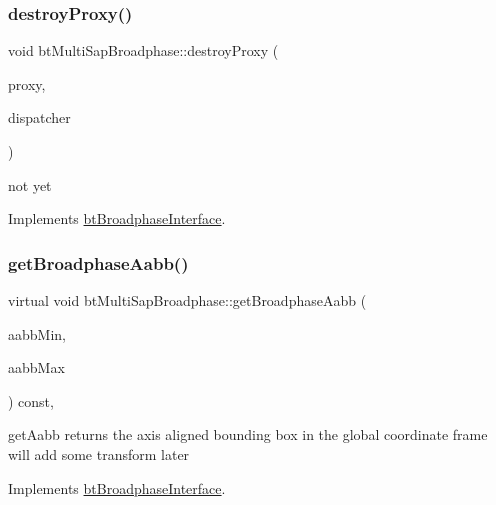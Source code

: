 \subsubsection{\texorpdfstring{destroy\+Proxy()}{destroyProxy()}}
{\footnotesize\ttfamily void bt\+Multi\+Sap\+Broadphase\+::destroy\+Proxy (\begin{DoxyParamCaption}\item[{bt\+Broadphase\+Proxy $\ast$}]{proxy,  }\item[{\hyperlink{classbtDispatcher}{bt\+Dispatcher} $\ast$}]{dispatcher }\end{DoxyParamCaption})\hspace{0.3cm}{\ttfamily [virtual]}}

not yet 

Implements \hyperlink{classbtBroadphaseInterface}{bt\+Broadphase\+Interface}.

\mbox{\label{classbtMultiSapBroadphase_a37a11b7ee2889d80adaf5add6fffe782}} 
\subsubsection{\texorpdfstring{get\+Broadphase\+Aabb()}{getBroadphaseAabb()}\hspace{0.1cm}{\footnotesize\ttfamily [1/2]}}
{\footnotesize\ttfamily virtual void bt\+Multi\+Sap\+Broadphase\+::get\+Broadphase\+Aabb (\begin{DoxyParamCaption}\item[{bt\+Vector3 \&}]{aabb\+Min,  }\item[{bt\+Vector3 \&}]{aabb\+Max }\end{DoxyParamCaption}) const\hspace{0.3cm}{\ttfamily [inline]}, {\ttfamily [virtual]}}

get\+Aabb returns the axis aligned bounding box in the \textquotesingle{}global\textquotesingle{} coordinate frame will add some transform later 

Implements \hyperlink{classbtBroadphaseInterface_ab5af9e26414f5a72a76040b8fab4d9e2}{bt\+Broadphase\+Interface}.

\mbox{\label{classbtMultiSapBroadphase_a37a11b7ee2889d80adaf5add6fffe782}} 
